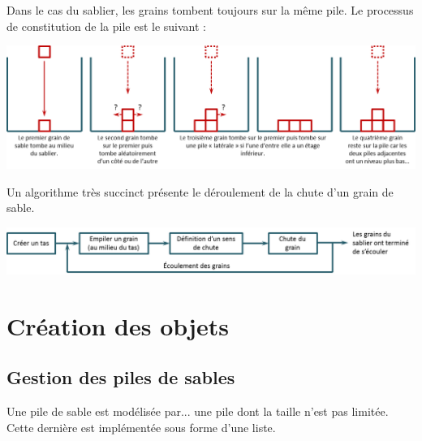 \documentclass[10pt,fleqn]{article} %
\begin{document}
Dans le cas du sablier, les grains tombent toujours sur la même pile. Le processus de constitution de la pile est le suivant : 
\begin{center}
\includegraphics[width=\linewidth]{images/sablier_02}
\end{center}

Un algorithme très succinct présente le déroulement de la chute d'un grain de sable.
\begin{center}
\includegraphics[width=\linewidth]{images/algo_02}
\end{center}

\fi

\section{Création des objets}
\subsection{Gestion des piles de sables}
Une pile de sable est modélisée par... une pile dont la taille n'est pas limitée. Cette dernière est implémentée sous forme d'une liste. 
\end{document}
